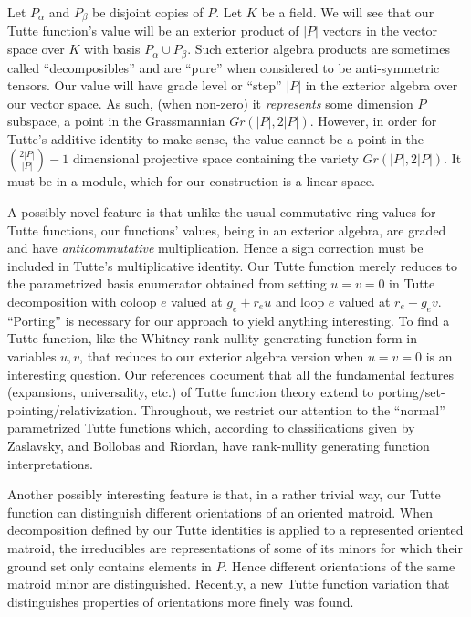 \documentclass[Unicode]{cedram-alco}
\begin{document}
Let $P_{\alpha}$ and $P_{\beta}$ be disjoint copies of $P$.  Let $K$ be a field.
We will see that our Tutte function's value will be an exterior product of
$|P|$ vectors in the vector space over $K$ with basis $P_\alpha \cup P_\beta$.
Such exterior algebra products are sometimes called ``decomposibles''\cite{MarcusFDMuAlPt2}
and are ``pure'' when considered to be anti-symmetric tensors.  Our value will
have grade level or ``step''  $|P|$ in the exterior algebra over our
vector space.
As such, (when non-zero)
it \emph{represents} some
dimension $P$ subspace, a point in the Grassmannian $Gr(|P|,2|P|)$.
However, in order for Tutte's additive identity to make sense, the value cannot be
a point in the $\binom{2|P|}{|P|}-1$ dimensional projective space
containing the variety $Gr(|P|,2|P|)$.  It must be in a module, which for
our construction is a linear space.

A possibly novel feature is that unlike the usual commutative ring values for Tutte
functions, our functions' values, being in an exterior algebra, are graded and have
\emph{anticommutative} multiplication.
Hence a sign correction must be included in Tutte's multiplicative
identity.  Our Tutte function merely reduces to the parametrized
basis enumerator obtained from setting $u=v=0$ in Tutte
decomposition with coloop $e$ valued at $g_e+r_eu$ and loop $e$ valued at $r_e+g_ev$.
``Porting'' is necessary for our approach to yield anything
interesting. To find a Tutte function, like the Whitney rank-nullity
generating function form in variables $u,v$, that reduces to our exterior
algebra version when $u=v=0$ is an interesting question.
Our
references\cite{MR0419272,SetPointedLV,sdcPorted,TutteEx,RelTuttePolyDiaoHetyei}
document that all the fundamental features
(expansions, universality, etc.)
of Tutte function theory extend to porting/set-pointing/relativization.  Throughout,
we restrict our attention to the ``normal'' parametrized Tutte functions which, according
to classifications given by Zaslavsky\cite{MR93a:05047},
and Bollobas and Riordan\cite{BollobasRiordanTuttePolyColored},
have rank-nullity generating function interpretations. 

Another possibly interesting feature is that, in a rather trivial way,
our Tutte function can distinguish different orientations of an oriented
matroid.  When decomposition defined by our Tutte identities is applied to
a represented oriented matroid, the irreducibles are representations of
some of its minors for which their ground set only contains elements in $P$.   Hence different
orientations of the same matroid minor are distinguished.  Recently,
a new Tutte function variation that distinguishes properties of orientations
more finely was found\cite{AwanBernardiOMTuttePre}.
\end{document}
